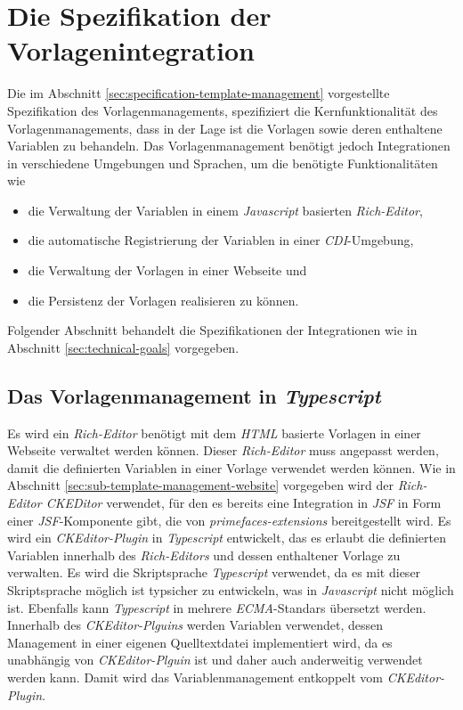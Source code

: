 \section{Die Spezifikation der Vorlagenintegration}
Die im Abschnitt \ref{sec:specification-template-management} vorgestellte Spezifikation des Vorlagenmanagements, spezifiziert die Kernfunktionalität des Vorlagenmanagements, dass in der Lage ist die Vorlagen sowie deren enthaltene Variablen zu behandeln. Das Vorlagenmanagement benötigt jedoch Integrationen in verschiedene Umgebungen und Sprachen, um die benötigte Funktionalitäten wie
\begin{itemize}
	\item die Verwaltung der Variablen in einem \emph{Javascript} basierten \emph{Rich-Editor},
	\item die automatische Registrierung der Variablen in einer \emph{CDI}-Umgebung,
	\item die Verwaltung der Vorlagen in einer Webseite und
	\item die Persistenz der Vorlagen realisieren zu können. 
\end{itemize}
Folgender Abschnitt behandelt die Spezifikationen der Integrationen wie in Abschnitt \ref{sec:technical-goals} vorgegeben. 
 
\subsection{Das Vorlagenmanagement in \emph{Typescript}}
\label{sec:sub-typescript-javascript}
Es wird ein \emph{Rich-Editor} benötigt mit dem \emph{HTML} basierte Vorlagen in einer Webseite verwaltet werden können. Dieser \emph{Rich-Editor} muss angepasst werden, damit die definierten Variablen in einer Vorlage verwendet werden können. Wie in Abschnitt \ref{sec:sub-template-management-website} vorgegeben wird der \emph{Rich-Editor CKEDitor} verwendet, für den es bereits eine Integration in \emph{JSF} in Form einer \emph{JSF}-Komponente gibt, die von \emph{primefaces-extensions} bereitgestellt wird. Es wird ein \emph{CKEditor-Plugin} in \emph{Typescript} entwickelt, das es erlaubt die definierten Variablen innerhalb des \emph{Rich-Editors} und dessen enthaltener Vorlage zu verwalten. Es wird die Skriptsprache \emph{Typescript} verwendet, da es mit dieser Skriptsprache möglich ist typsicher zu entwickeln, was in \emph{Javascript} nicht möglich ist. Ebenfalls kann \emph{Typescript} in mehrere \emph{ECMA}-Standars übersetzt werden.
\newline
\newline
Innerhalb des \emph{CKEditor-Plguins} werden Variablen verwendet, dessen Management in einer eigenen Quelltextdatei implementiert wird, da es unabhängig von \emph{CKEditor-Plguin} ist und daher auch anderweitig verwendet werden kann. Damit wird das Variablenmanagement entkoppelt vom \emph{CKEditor-Plugin}.

